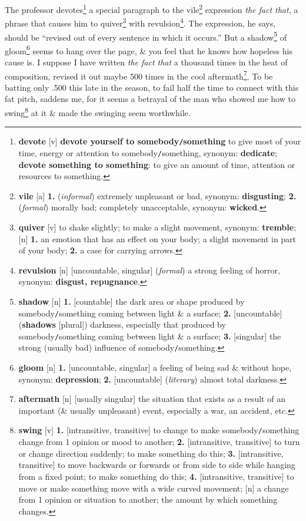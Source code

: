 \documentclass{article}
\begin{document}
The professor devotes\footnote{{\bf devote} [v] {\bf devote yourself to somebody{\tt/}something} to give most of your time, energy or attention to somebody{\tt/}something, {\sc synonym}: {\bf dedicate}; {\bf devote something to something}: to give an amount of time, attention or resources to something.} a special paragraph to the vile\footnote{{\bf vile} [a] {\bf 1.} ({\it informal}) extremely unpleasant or bad, {\sc synonym}: {\bf disgusting}; {\bf 2.} ({\it formal}) morally bad; completely unacceptable, {\sc synonym}: {\bf wicked}.} expression {\it the fact that}, a phrase that causes him to quiver\footnote{{\bf quiver} [v] to shake slightly; to make a slight movement, {\sc synonym}: {\bf tremble}; [n] {\bf 1.} an emotion that has an effect on your body; a slight movement in part of your body; {\bf 2.} a case for carrying arrows.} with revulsion\footnote{{\bf revulsion} [n] [uncountable, singular] ({\it formal}) a strong feeling of horror, {\sc synonym}: {\bf disgust, repugnance}.}. The expression, he says, should be ``revised out of every sentence in which it occurs.'' But a shadow\footnote{{\bf shadow} [n] {\bf 1.} [countable] the dark area or shape produced by somebody{\tt/}something coming between light \& a surface; {\bf 2.} [uncountable] ({\bf shadows} [plural]) darkness, especially that produced by somebody{\tt/}something coming between light \& a surface; {\bf 3.} [singular] the strong (usually bad) influence of somebody{\tt/}something.} of gloom\footnote{{\bf gloom} [n] {\bf 1.} [uncountable, singular] a feeling of being sad \& without hope, {\sc synonym}: {\bf depression}; {\bf 2.} [uncountable] ({\it literary}) almost total darkness.} seems to hang over the page, \& you feel that he knows how hopeless his cause is. I suppose I have written {\it the fact that} a thousand times in the heat of composition, revised it out maybe 500 times in the cool aftermath\footnote{{\bf aftermath} [n] [usually singular] the situation that exists as a result of an important (\& usually unpleasant) event, especially a war, an accident, etc.}. To be batting only .500 this late in the season, to fail half the time to connect with this fat pitch, saddens me, for it seems a betrayal of the man who showed me how to swing\footnote{{\bf swing} [v] {\bf 1.} [intransitive, transitive] to change to make somebody{\tt/}something change from 1 opinion or mood to another; {\bf 2.} [intransitive, transitive] to turn or change direction suddenly; to make something do this; {\bf 3.} [intransitive, transitive] to move backwards or forwards or from side to side while hanging from a fixed point; to make something do this; {\bf 4.} [intransitive, transitive] to move or make something move with a wide curved movement; [n] a change from 1 opinion or situation to another; the amount by which something changes.} at it \& made the swinging seem worthwhile.
\end{document}
